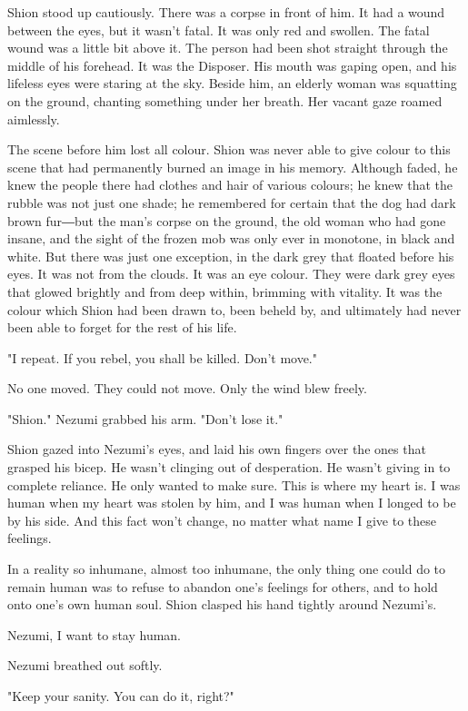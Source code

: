 Shion stood up cautiously. There was a corpse in front of him. It had a
wound between the eyes, but it wasn't fatal. It was only red and
swollen. The fatal wound was a little bit above it. The person had been
shot straight through the middle of his forehead. It was the Disposer.
His mouth was gaping open, and his lifeless eyes were staring at the
sky. Beside him, an elderly woman was squatting on the ground, chanting
something under her breath. Her vacant gaze roamed aimlessly.

The scene before him lost all colour. Shion was never able to give
colour to this scene that had permanently burned an image in his memory.
Although faded, he knew the people there had clothes and hair of various
colours; he knew that the rubble was not just one shade; he remembered
for certain that the dog had dark brown fur―but the man's corpse on the
ground, the old woman who had gone insane, and the sight of the frozen
mob was only ever in monotone, in black and white. But there was just
one exception, in the dark grey that floated before his eyes. It was not
from the clouds. It was an eye colour. They were dark grey eyes that
glowed brightly and from deep within, brimming with vitality. It was the
colour which Shion had been drawn to, been beheld by, and ultimately had
never been able to forget for the rest of his life.

"I repeat. If you rebel, you shall be killed. Don't move."

No one moved. They could not move. Only the wind blew freely.

"Shion." Nezumi grabbed his arm. "Don't lose it."

Shion gazed into Nezumi's eyes, and laid his own fingers over the ones
that grasped his bicep. He wasn't clinging out of desperation. He wasn't
giving in to complete reliance. He only wanted to make sure. This is
where my heart is. I was human when my heart was stolen by him, and I
was human when I longed to be by his side. And this fact won't change,
no matter what name I give to these feelings.

In a reality so inhumane, almost too inhumane, the only thing one could
do to remain human was to refuse to abandon one's feelings for others,
and to hold onto one's own human soul. Shion clasped his hand tightly
around Nezumi's.

Nezumi, I want to stay human.

Nezumi breathed out softly.

"Keep your sanity. You can do it, right?"

